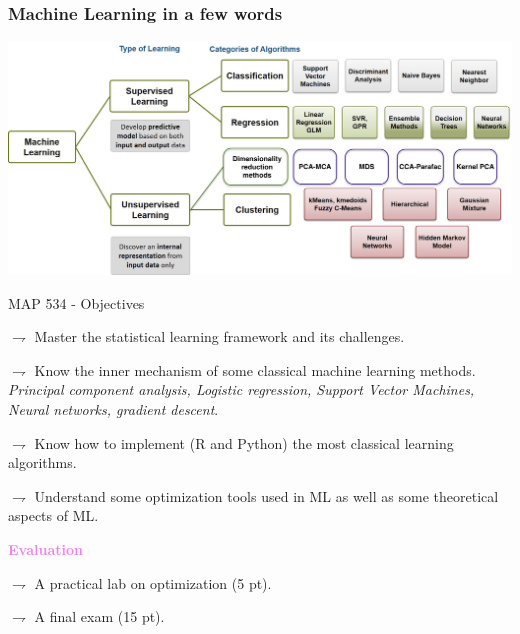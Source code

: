 \documentclass[9pt]{beamer}
\begin{document}
\begin{frame}\frametitle{Machine Learning in a few words}
\begin{center}
\includegraphics[width=\textwidth]{./Learning+Types.jpg}
\end{center}
\end{frame}

\begin{frame}{MAP 534 - Objectives}

$\rightharpoondown$ Master the \alert{statistical learning} framework and its challenges.

$\rightharpoondown$ Know the inner mechanism of some classical \alert{machine learning methods}.\\
{\em {\small Principal component analysis, Logistic regression, Support Vector Machines, Neural networks, gradient descent}}.

$\rightharpoondown$ Know how to implement (\alert{R and Python}) the most classical \alert{learning} algorithms.

$\rightharpoondown$ Understand some \alert{optimization} tools used in ML as well as some \alert{theoretical aspects} of ML.

\vspace{.5cm}

\textcolor{violet}{{\bf Evaluation}}

$\rightharpoondown$ A practical lab on optimization (5 pt).

$\rightharpoondown$ A final exam (15 pt).

\end{frame}
\end{document}
